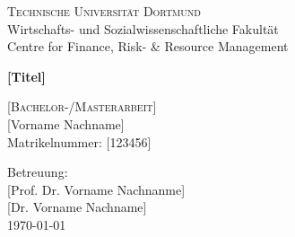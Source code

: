 
\begin{titlepage}
		\begin{center}
			{\LARGE \textsc{Technische Universität Dortmund}} \\ [4ex]
			{\Large Wirtschafts- und Sozialwissenschaftliche Fakultät \\
			Centre for Finance, Risk- \& Resource Management}
		\end{center}
	\vspace*{7.5ex}
	
		\begin{center}
			\Huge \textbf{[Titel]}
		\end{center}
	\vspace*{6.5ex}
	
		\begin{center}
			{\huge \textsc{[Bachelor-/Masterarbeit]} \\[6ex]}
			{\Large [Vorname Nachname] \\
			Matrikelnummer: [123456]}
		\end{center}
		
		\begin{flushleft}
			{\large Betreuung: \\
			{[Prof. Dr. Vorname Nachnanme]} \\
			{[Dr. Vorname Nachname]} \\
			\vspace*{4ex}
			\today \\}
		\end{flushleft}

\end{titlepage}
